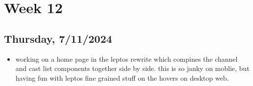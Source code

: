 \newpage
\section{Week 12}

\subsection*{Thursday, 7/11/2024}
\begin{itemize}
    \item working on a home page in the leptos rewrite which compines the
        channel and cast list components together side by side. this is so janky
        on moblie, but having fun with leptos fine grained stuff on the hovers
        on desktop web.
\end{itemize}

